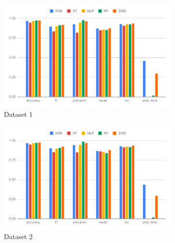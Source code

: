 \begin{figure}[H]
  \begin{subfigure}{.5\columnwidth}
    \centering
    \includegraphics[width=0.9\columnwidth]{media/data/performance/perf_ds_1.pdf}
    \caption{Dataset 1}
    \label{fig:perfromance_results_dataset_1}
  \end{subfigure}%
  \begin{subfigure}{.5\columnwidth}
    \centering
    \includegraphics[width=0.9\columnwidth]{media/data/performance/perf_ds_2.pdf}
    \caption{Dataset 2}
    \label{fig:perfromance_results_dataset_2}
  \end{subfigure}\\%
  \begin{subfigure}{.5\columnwidth}
    \centering

\end{subfigure}
\end{figure}

